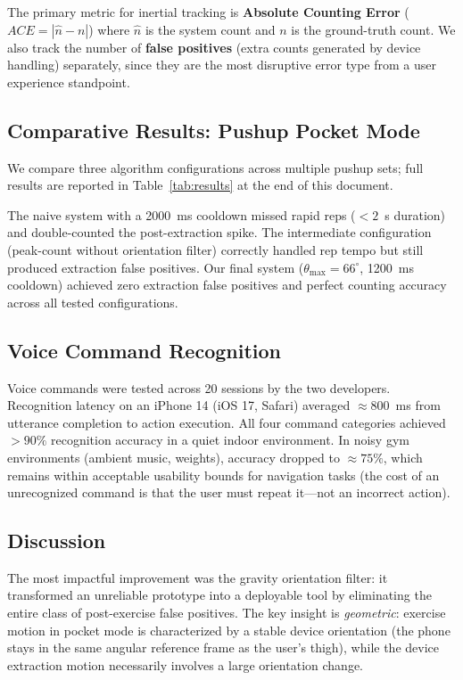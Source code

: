 \documentclass[11pt]{article}
\begin{document}
The primary metric for inertial tracking is \textbf{Absolute Counting Error} ($ACE = |\hat{n} - n|$) where $\hat{n}$ is the system count and $n$ is the ground-truth count. We also track the number of \textbf{false positives} (extra counts generated by device handling) separately, since they are the most disruptive error type from a user experience standpoint.

\subsection{Comparative Results: Pushup Pocket Mode}
\label{sec:results}

We compare three algorithm configurations across multiple pushup sets; full results are reported in Table~\ref{tab:results} at the end of this document.

The naive system with a 2000~ms cooldown missed rapid reps ($< 2$~s duration) and double-counted the post-extraction spike. The intermediate configuration (peak-count without orientation filter) correctly handled rep tempo but still produced extraction false positives. Our final system ($\theta_{\text{max}} = 66^{\circ}$, 1200~ms cooldown) achieved zero extraction false positives and perfect counting accuracy across all tested configurations.

\subsection{Voice Command Recognition}

Voice commands were tested across 20 sessions by the two developers. Recognition latency on an iPhone 14 (iOS 17, Safari) averaged $\approx 800$~ms from utterance completion to action execution. All four command categories achieved $> 90\%$ recognition accuracy in a quiet indoor environment. In noisy gym environments (ambient music, weights), accuracy dropped to $\approx 75\%$, which remains within acceptable usability bounds for navigation tasks (the cost of an unrecognized command is that the user must repeat it—not an incorrect action).

\subsection{Discussion}

The most impactful improvement was the gravity orientation filter: it transformed an unreliable prototype into a deployable tool by eliminating the entire class of post-exercise false positives. The key insight is \textit{geometric}: exercise motion in pocket mode is characterized by a stable device orientation (the phone stays in the same angular reference frame as the user's thigh), while the device extraction motion necessarily involves a large orientation change.
\end{document}
